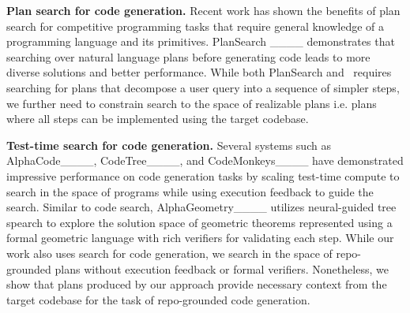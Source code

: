 \noindent\textbf{Plan search for code generation.} Recent work has shown the benefits of plan search for competitive programming tasks that require general knowledge of a programming language and its primitives. PlanSearch ____ demonstrates that searching over natural language plans before generating code leads to more diverse solutions and better performance. While both PlanSearch and \method~requires searching for plans that decompose a user query into a sequence of simpler steps, we further need to constrain search to the space of realizable plans i.e. plans where all steps can be implemented using the target codebase. 

\noindent\textbf{Test-time search for code generation.} Several systems such as AlphaCode____, CodeTree____, and CodeMonkeys____ have demonstrated impressive performance on code generation tasks by scaling test-time compute to search in the space of programs while using execution feedback to guide the search. Similar to code search, AlphaGeometry____ utilizes neural-guided tree spearch to explore the solution space of geometric theorems represented using a formal geometric language with rich verifiers for validating each step. While our work also uses search for code generation, we search in the space of repo-grounded plans without execution feedback or formal verifiers. Nonetheless, we show that plans produced by our approach provide necessary context from the target codebase for the task of repo-grounded code generation.